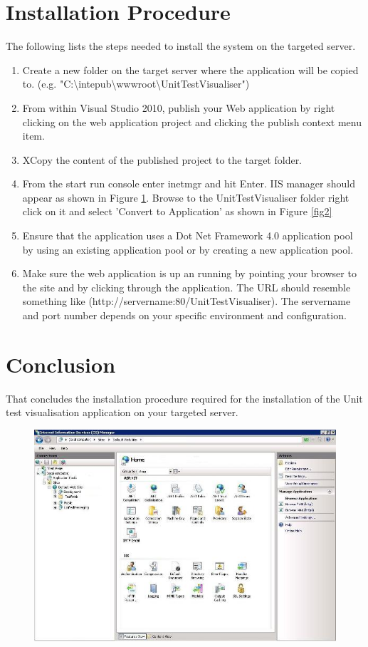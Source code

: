 \documentclass[a4paper,12pt]{article}
\begin{document}
\section{Installation Procedure}
The following lists the steps needed to install the system on the targeted server.
\begin{enumerate}
\item Create a new folder on the target server where the application will be copied to. (e.g. "C:\textbackslash intepub\textbackslash wwwroot\textbackslash UnitTestVisualiser")
\item From within Visual Studio 2010\cite{vs2010}, publish your Web application by right clicking on the web application project and clicking the publish context menu item.
\item XCopy the content of the published project to the target folder.
\item From the start run console enter inetmgr and hit Enter. IIS manager should appear as shown in Figure \ref{fig1}. Browse to the UnitTestVisualiser folder right click on it and select 'Convert to Application' as shown in Figure \ref{fig2}
\item Ensure that the application uses a Dot Net Framework 4.0 application pool by using an existing application pool or by creating a new application pool.
\item Make sure the web application is up an running by pointing your browser to the site and by clicking through the application. The URL should resemble something like (http://servername:80/UnitTestVisualiser). The servername and port number depends on your specific environment and configuration.
\end{enumerate}

\section{Conclusion}
That concludes the installation procedure required for the installation of the Unit test visualisation application on your targeted server.

\begin{center}
	\begin{figure}
		\includegraphics{Main_DefaultIIS.JPG}
			\caption{}
			\label{fig1}    
	\end{figure}	
\end{center}
\end{document}

